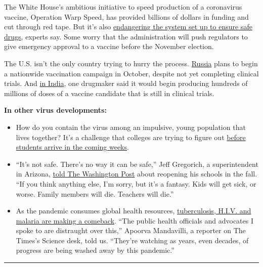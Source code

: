 The White House's ambitious initiative to speed production of a
coronavirus vaccine, Operation Warp Speed, has provided billions of
dollars in funding and cut through red tape. But it's also
\href{https://www.nytimes.com/2020/08/02/us/politics/coronavirus-vaccine.html}{endangering
the system set up to ensure safe drugs}, experts say. Some worry that
the administration will push regulators to give emergency approval to a
vaccine before the November election.

The U.S. isn't the only country trying to hurry the process.
\href{https://www.nytimes.com/2020/08/02/world/europe/russia-trials-vaccine-October.html}{Russia}
plans to begin a nationwide vaccination campaign in October, despite not
yet completing clinical trials. And
\href{https://www.nytimes.com/2020/08/01/world/asia/coronavirus-vaccine-india.html}{in
India}, one drugmaker said it would begin producing hundreds of millions
of doses of a vaccine candidate that is still in clinical trials.

\textbf{In other virus developments:}

\begin{itemize}
\item
  How do you contain the virus among an impulsive, young population that
  lives together? It's a challenge that colleges are trying to figure
  out
  \href{https://www.nytimes.com/2020/08/02/us/covid-college-reopening.html}{before
  students arrive in the coming weeks}.
\item
  ``It's not safe. There's no way it can be safe,'' Jeff Gregorich, a
  superintendent in Arizona,
  \href{https://www.washingtonpost.com/nation/2020/08/01/schools-reopening-coronavirus-arizona-superintendent/?arc404=true}{told
  The Washington Post} about reopening his schools in the fall. ``If you
  think anything else, I'm sorry, but it's a fantasy. Kids will get
  sick, or worse. Family members will die. Teachers will die.''
\item
  As the pandemic consumes global health resources,
  \href{https://www.nytimes.com/2020/08/03/health/coronavirus-tuberculosis-aids-malaria.html}{tuberculosis,
  H.I.V. and malaria are making a comeback}. ``The public health
  officials and advocates I spoke to are distraught over this,'' Apoorva
  Mandavilli, a reporter on The Times's Science desk, told us. ``They're
  watching as years, even decades, of progress are being washed away by
  this pandemic.''
\end{itemize}

\begin{center}\rule{0.5\linewidth}{\linethickness}\end{center}

